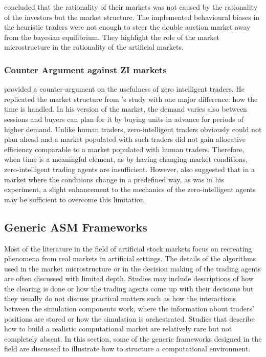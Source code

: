 \citet{Jam96} concluded that the rationality of their markets was
not caused by the rationality of the investors but the market structure.
The implemented behavioural biases in the heuristic traders were not enough 
to steer the double auction market away from the bayesian equilibrium.
They highlight the role of the market microstructure in the rationality 
of the artificial markets. 


\subsubsection{Counter Argument against ZI markets}
\citet{Mil08} provided a counter-argument on the usefulness of zero
intelligent traders. He replicated the market structure from
\citet{God93}'s study with one major difference: how the 
time is handled. In his version of the market, the demand varies
also between sessions and buyers can plan for it by buying units
in advance for periods of higher demand. Unlike human traders,
zero-intelligent traders obviously could not plan ahead and a market
populated with such traders did not gain allocative efficiency comparable
to a market populated with human traders. Therefore, when time is a 
meaningful element, as by having changing market conditions, zero-intelligent 
trading agents are insufficient. However, \citet{Mil08} also suggested
that in a market where the conditions change in a predefined way, as was in 
his experiment, a slight enhancement to the mechanics of the zero-intelligent 
agents may be sufficient to overcome this limitation.



\subsection{Generic ASM Frameworks}

Most of the literature in the field of artificial stock markets 
focus on recreating phenomena from real markets in artificial settings.
The details of the algorithms used in the market microstructure or in
the decision making of the trading agents are often discussed with limited 
depth. Studies may include descriptions of how the clearing is done or how the trading agents 
come up with their decisions but they usually do not discuss practical matters 
such as how the interactions between the simulation components work, where the 
information about traders' positions are stored or how the simulation is orchestrated. 
Studies that describe how to build a realistic computational 
market are relatively rare but not completely absent. In this section, some of the 
generic frameworks designed in the field are discussed to illustrate how 
to structure a computational environment.


